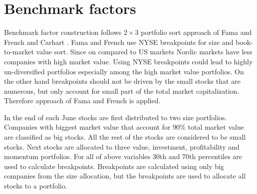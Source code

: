 \documentclass{article}
\begin{document}
\section{Benchmark factors}
\renewcommand{\thefigure}{B.\arabic{figure}}
\setcounter{figure}{0}
\renewcommand{\thetable}{B.\arabic{table}}
\setcounter{table}{0}

Benchmark factor construction follows $2 \times 3$ portfolio sort approach of Fama and French \citeyear{FAMA19933, FAMA20151} and Carhart \citeyear{Carhart1997}. Fama and French \citeyear{FAMA19933} use NYSE breakpoints for size and book-to-market value sort. Since on compared to US markets Nordic markets have less companies with high market value. Using NYSE breakpoints could lead to highly un-diversified portfolios especially among the high market value portfolios. On the other hand breakpoints should not be driven by the small stocks that are numerous, but only account for small part of the total market capitalization. Therefore approach of Fama and French \citeyear{FAMA2012457} is applied. 

In the end of each June stocks are first distributed to two size portfolios. Companies with biggest market value that account for $90\%$ total market value are classified as big stocks. All the rest of the stocks are considered to be small stocks. Next stocks are allocated to three value, investment, profitability and momentum portfolios. For all of above variables 30th and 70th percentiles are used to calculate breakpoints. Breakpoints are calculated using only big companies from the size allocation, but the breakpoints are used to allocate all stocks to a portfolio.
\end{document}
